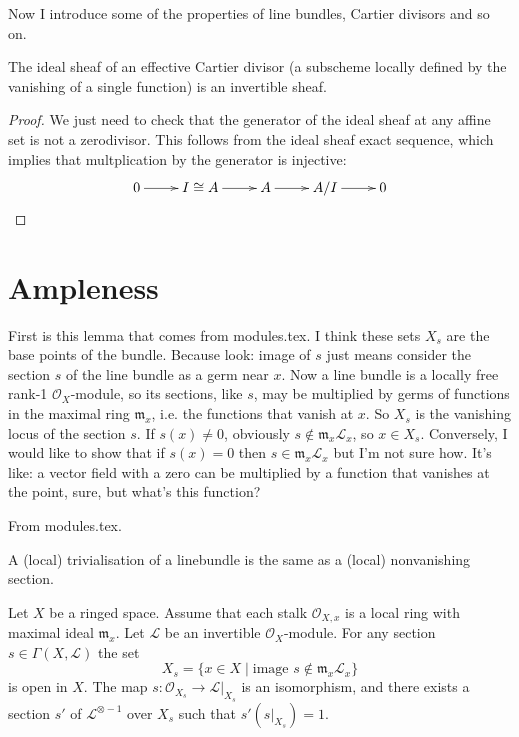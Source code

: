 Now I introduce some of the properties of line bundles, Cartier divisors and so
on.

\begin{lemma}
\label{lemma-Cartier-effective-and-invertible-sheaf}
The ideal sheaf of an effective Cartier divisor (a subscheme locally defined by
the vanishing of a single function) is an invertible sheaf.
\end{lemma}

\begin{proof}
We just need to check that the generator of the ideal sheaf at any affine set is
not a zerodivisor. This follows from the ideal sheaf exact sequence, which
implies that multplication by the generator is injective:
 $$
\xymatrix{
0\ar[r]&I\cong A\ar[r]&A\ar[r]&A/I\ar[r]&0
}
$$
\end{proof}


\section{Ampleness}
\label{section-ampleness}

First is this lemma that comes from modules.tex. I think these sets $X_s$ are
the base points of the bundle. Because look: image of $s$ just means consider
the section $s$ of the line bundle as a germ near $x$. Now a line bundle is a
locally free rank-1 $\mathcal{O}_X$-module, so its sections, like $s$, may be
multiplied by germs of functions in the maximal ring $\mathfrak{m}_x$, i.e. the
functions that vanish at $x$. So $X_s$ is the vanishing locus of the section
$s$. If $s(x)\neq 0$, obviously $s
\not\in\mathfrak{m}_x\mathcal{L}_x$, so $x\in X_s$. Conversely, I would like to
show that if $s(x)=0$ then  $s\in\mathfrak{m}_x\mathcal{L}_x$ but I'm not sure
how. It's like: a vector field with a zero can be multiplied by a function that
vanishes at the point, sure, but what's this function?

\begin{lemma}
\label{lemma-s-open}
From modules.tex.
\begin{slogan}
A (local) trivialisation of a linebundle
is the same as a (local) nonvanishing section.
\end{slogan}
Let $X$ be a ringed space. Assume that each stalk $\mathcal{O}_{X, x}$
is a local ring with maximal ideal $\mathfrak m_x$.
Let $\mathcal{L}$ be an invertible $\mathcal{O}_X$-module.
For any section $s \in \Gamma(X, \mathcal{L})$ the set
$$
X_s = \{x \in X \mid \text{image }s \not\in \mathfrak m_x\mathcal{L}_x\}
$$
is open in $X$. The map $s : \mathcal{O}_{X_s} \to \mathcal{L}|_{X_s}$
is an isomorphism, and there exists a section $s'$
of $\mathcal{L}^{\otimes -1}$ over $X_s$ such that $s' (s|_{X_s}) = 1$.
\end{lemma}

